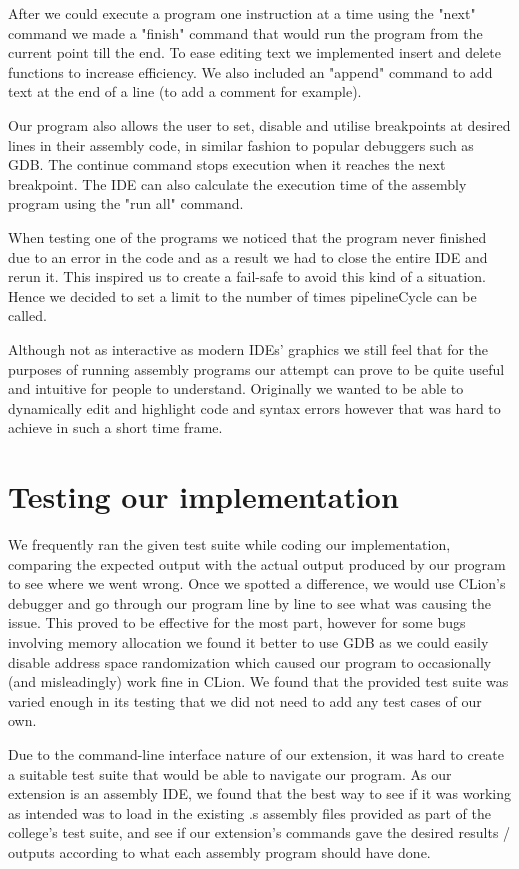 \documentclass[11pt]{article}
\begin{document}
After we could execute a program one instruction at a time using the "next" command we made a "finish" command that would run the program from the current point till the end. To ease editing text we implemented insert and delete functions to increase efficiency. We also included an "append" command to add text at the end of a line (to add a comment for example). 

Our program also allows the user to set, disable and utilise breakpoints at desired lines in their assembly code, in similar fashion to popular debuggers such as GDB. The continue command stops execution when it reaches the next breakpoint. The IDE can also calculate the execution time of the assembly program using the "run all" command.

When testing one of the programs we noticed that the program never finished due to an error in the code and as a result we had to close the entire IDE and rerun it. This inspired us to create a fail-safe to avoid this kind of a situation. Hence we decided to set a limit to the number of times pipelineCycle can be called.
 
Although not as interactive as modern IDEs' graphics we still feel that for the purposes of running assembly programs our attempt can prove to be quite useful and intuitive for people to understand.
Originally we wanted to be able to dynamically edit and highlight code and syntax errors however that was hard to achieve in such a short time frame. 


\section*{Testing our implementation}
We frequently ran the given test suite while coding our implementation, comparing the expected output with the actual output produced by our program to see where we went wrong. Once we spotted a difference, we would use CLion's debugger and go through our program line by line to see what was causing the issue. This proved to be effective for the most part, however for some bugs involving memory allocation we found it better to use GDB as we could easily disable address space randomization which caused our program to occasionally (and misleadingly) work fine in CLion. We found that the provided test suite was varied enough in its testing that we did not need to add any test cases of our own.

Due to the command-line interface nature of our extension, it was hard to create a suitable test suite that would be able to navigate our program. As our extension is an assembly IDE, we found that the best way to see if it was working as intended was to load in the existing .s assembly files provided as part of the college's test suite, and see if our extension's commands gave the desired results / outputs according to what each assembly program should have done.
\end{document}
